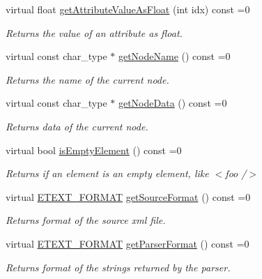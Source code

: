\begin{DoxyCompactItemize}
virtual float \hyperlink{classirr_1_1io_1_1IIrrXMLReader_a3a01b3cec9db01d00928074846d39add}{get\+Attribute\+Value\+As\+Float} (int idx) const =0
\begin{DoxyCompactList}\small\item\em Returns the value of an attribute as float. \end{DoxyCompactList}\item 
virtual const char\+\_\+type $\ast$ \hyperlink{classirr_1_1io_1_1IIrrXMLReader_a7d745b130c895d0f910f191d04e20e87}{get\+Node\+Name} () const =0
\begin{DoxyCompactList}\small\item\em Returns the name of the current node. \end{DoxyCompactList}\item 
virtual const char\+\_\+type $\ast$ \hyperlink{classirr_1_1io_1_1IIrrXMLReader_aecbe0698e8f9acf88e27dd53da984210}{get\+Node\+Data} () const =0
\begin{DoxyCompactList}\small\item\em Returns data of the current node. \end{DoxyCompactList}\item 
\mbox{\label{classirr_1_1io_1_1IIrrXMLReader_a3c85b144e0376c9ff90bce1bbbc338a9}} 
virtual bool \hyperlink{classirr_1_1io_1_1IIrrXMLReader_a3c85b144e0376c9ff90bce1bbbc338a9}{is\+Empty\+Element} () const =0
\begin{DoxyCompactList}\small\item\em Returns if an element is an empty element, like $<$foo /$>$ \end{DoxyCompactList}\item 
virtual \hyperlink{namespaceirr_1_1io_ac7e51e5a6bd00451dec248f497b16a9d}{E\+T\+E\+X\+T\+\_\+\+F\+O\+R\+M\+AT} \hyperlink{classirr_1_1io_1_1IIrrXMLReader_a00998ef2d3a562d6b2b8302c3430322d}{get\+Source\+Format} () const =0
\begin{DoxyCompactList}\small\item\em Returns format of the source xml file. \end{DoxyCompactList}\item 
virtual \hyperlink{namespaceirr_1_1io_ac7e51e5a6bd00451dec248f497b16a9d}{E\+T\+E\+X\+T\+\_\+\+F\+O\+R\+M\+AT} \hyperlink{classirr_1_1io_1_1IIrrXMLReader_a9af7e323c292a4836bf4a7c093b4d85a}{get\+Parser\+Format} () const =0
\begin{DoxyCompactList}\small\item\em Returns format of the strings returned by the parser. \end{DoxyCompactList}\item 

\end{DoxyCompactItemize}
